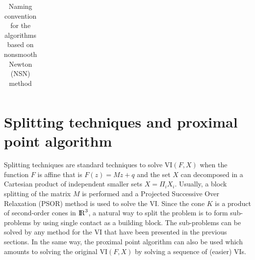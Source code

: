 \begin{table}[htbp]
\begin{tabular}{|l|l|p{}|}
  \end{tabular}
  \caption{Naming convention for the algorithms based on nonsmooth Newton (NSN) method}
  \label{tab:NSN-algos}
\end{table}






\section{Splitting techniques and proximal point algorithm}
\label{Sec:SplittingTechniquesAndProx}

Splitting techniques are standard techniques to solve $\mathrm{VI}(F,X)$ when the function $F$ is affine that is $F(z) = Mz+q$ and the set $X$ can decomposed in a Cartesian product of independent smaller sets $X = \Pi_{i} X_i$.
Usually, a block splitting of the matrix $M$ is performed and a Projected Successive Over Relaxation (PSOR) method is used to solve the VI. Since the cone $K$ is a product of second-order cones in $\mathrm{I\!R}^3$, a natural way to split the problem is to form sub-problems by using single contact as a building block. The sub-problems can be solved by any method for the VI that have been presented in the previous sections. In the same way, the proximal point algorithm can also be used which amounts to solving the original $\mathrm{VI}(F,X)$ by solving a sequence of (easier) VIs.


